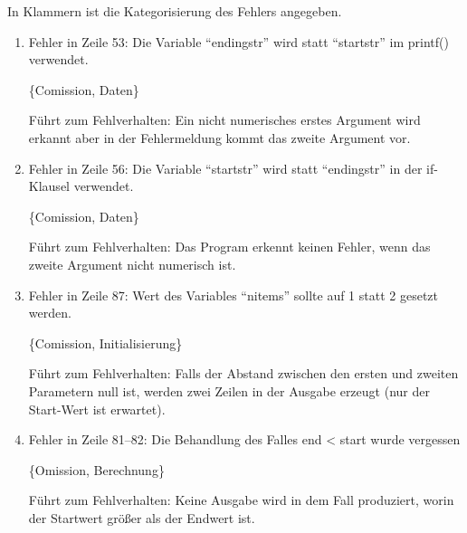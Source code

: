 

In Klammern ist die Kategorisierung des Fehlers angegeben.

\begin{enumerate}

\item Fehler in Zeile 53: Die Variable ``endingstr'' wird statt ``startstr'' im
printf() verwendet. 

\{Comission, Daten\}

F\"uhrt zum Fehlverhalten:
Ein nicht numerisches erstes Argument wird erkannt aber in
der Fehlermeldung kommt das zweite Argument vor.


\item Fehler in Zeile 56: Die Variable ``startstr'' wird statt ``endingstr'' in
der if-Klausel verwendet. 

\{Comission, Daten\}

F\"uhrt zum Fehlverhalten:
Das Program erkennt keinen Fehler, wenn das zweite Argument
nicht numerisch ist.


\item Fehler in Zeile 87: Wert des Variables ``nitems'' sollte auf 1 statt 2
gesetzt werden. 

\{Comission, Initialisierung\}

F\"uhrt zum Fehlverhalten:
Falls der Abstand zwischen den ersten und zweiten Parametern
null ist, werden zwei  Zeilen in der Ausgabe erzeugt (nur der
Start-Wert ist erwartet). 


\item Fehler in Zeile 81--82: Die Behandlung des Falles end < start wurde
vergessen 

\{Omission, Berechnung\}

F\"uhrt zum Fehlverhalten:
Keine Ausgabe wird in dem Fall produziert, worin der Startwert
gr\"o{\ss}er als der Endwert ist.

\end{enumerate}
